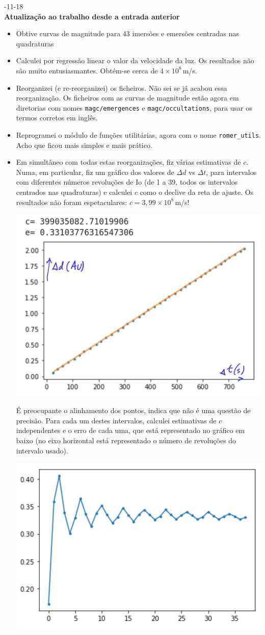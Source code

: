 \documentclass[]{article}
\newcommand{\newlog}[2]{%
  \par
  \vspace{\baselineskip}
  \noindent
  #1\\
  \textbf{#2}\\
}
\begin{document}
\pagebreak[4]
\newlog{2024-11-18}{Atualização ao trabalho desde a entrada anterior}
\nopagebreak[4]
\begin{itemize}
  \item Obtive curvas de magnitude para 43 imersões e emersões centradas nas
    quadraturas
  \item Calculei por regressão linear o valor da velocidade da luz. Os
    resultados não são muito entusiasmantes. Obtém-se cerca de
    $4\times10^8$\,m/s.
  \item
    Reorganizei (e re-reorganizei) os ficheiros. Não sei se já
    acabou essa reorganização. Os ficheiros com as curvas de magnitude estão
    agora em diretorias com nomes \texttt{magc/emergences} e
    \texttt{magc/occultations}, para usar os termos corretos em inglês.
  \item
    Reprogramei o módulo de funções utilitárias, agora com o nome
    \texttt{romer\_utils}. Acho que ficou mais simples e mais prático.
  \item
    Em simultâneo com todas estas reorganizações, fiz várias estimativas de $c$.
    Numa, em particular, fiz um gráfico dos valores de $\Delta d$ vs $\Delta t$,
    para intervalos com diferentes números revoluções de Io (de 1 a 39, todos os
    intervalos centrados nas quadraturas) e calculei $c$ como o declive da reta
    de ajuste. Os resultados não foram espetaculares: $c=3,99\times10^8$\,m/s!
    \begin{center}
      \includegraphics[width=0.5\linewidth]{figs/2024-11-18_a.png}
    \end{center}
    É preocupante o alinhamento dos pontos, indica que não é uma questão de
    precisão. Para cada um destes intervalos, calculei estimativas
    de $c$ independentes e o erro de cada uma, que está representado no gráfico
    em baixo (no eixo horizontal está representado o número de revoluções do
    intervalo usado).
    \begin{center}
      \includegraphics[width=0.5\linewidth]{figs/2024-11-18_b.png}
    \end{center}
\end{itemize}
\end{document}

